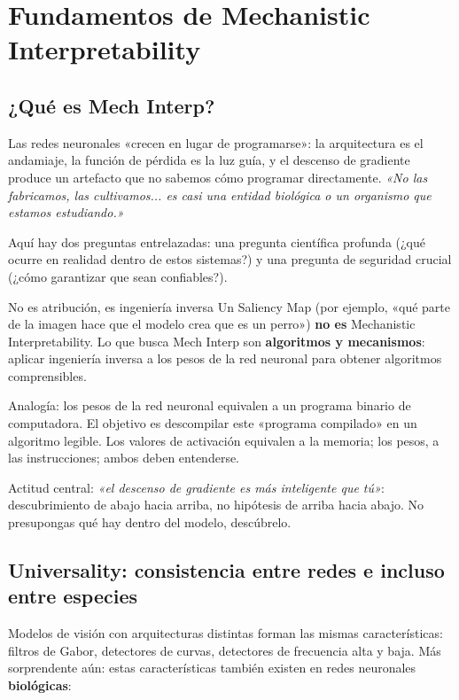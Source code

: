 \section{Fundamentos de Mechanistic Interpretability}

\subsection{¿Qué es Mech Interp?}

Las redes neuronales «crecen en lugar de programarse»: la arquitectura es el andamiaje, la función de pérdida es la luz guía, y el descenso de gradiente produce un artefacto que no sabemos cómo programar directamente. \textit{«No las fabricamos, las cultivamos... es casi una entidad biológica o un organismo que estamos estudiando.»}

Aquí hay dos preguntas entrelazadas: una pregunta científica profunda (¿qué ocurre en realidad dentro de estos sistemas?) y una pregunta de seguridad crucial (¿cómo garantizar que sean confiables?).

\begin{importantbox}{No es atribución, es ingeniería inversa}
Un Saliency Map (por ejemplo, «qué parte de la imagen hace que el modelo crea que es un perro») \textbf{no es} Mechanistic Interpretability. Lo que busca Mech Interp son \textbf{algoritmos y mecanismos}: aplicar ingeniería inversa a los pesos de la red neuronal para obtener algoritmos comprensibles.

Analogía: los pesos de la red neuronal equivalen a un programa binario de computadora. El objetivo es descompilar este «programa compilado» en un algoritmo legible. Los valores de activación equivalen a la memoria; los pesos, a las instrucciones; ambos deben entenderse.

Actitud central: \textit{«el descenso de gradiente es más inteligente que tú»}: descubrimiento de abajo hacia arriba, no hipótesis de arriba hacia abajo. No presupongas qué hay dentro del modelo, descúbrelo.
\end{importantbox}

\subsection{Universality: consistencia entre redes e incluso entre especies}

Modelos de visión con arquitecturas distintas forman las mismas características: filtros de Gabor, detectores de curvas, detectores de frecuencia alta y baja. Más sorprendente aún: estas características también existen en redes neuronales \textbf{biológicas}:

